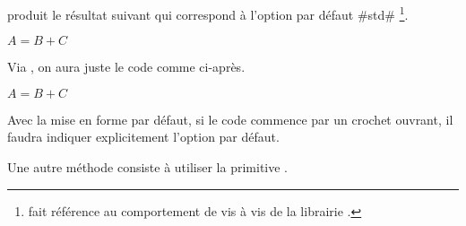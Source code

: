 \documentclass[10pt, a4paper]{article}
\begin{document}


\begin{tdocexa}[À la suite]
     produit le résultat suivant qui correspond à l'option par défaut \tdocinlatex#std#
    \footnote{
         fait référence au comportement  de  vis à vis de la librairie .
    }.

    \begin{tdoclatex}
        $A = B + C$
    \end{tdoclatex}
\end{tdocexa}




\begin{tdocexa}
    Via , on aura juste le code comme ci-après.

    \begin{tdoclatex}[code]
        $A = B + C$
    \end{tdoclatex}
\end{tdocexa}




\begin{tdocwarn}
    Avec la mise en forme par défaut, si le code commence par un crochet ouvrant, il faudra indiquer explicitement l'option par défaut.
    
    \smallskip
    
    Une autre méthode consiste à utiliser la primitive .
\end{tdocwarn}
\end{document}
